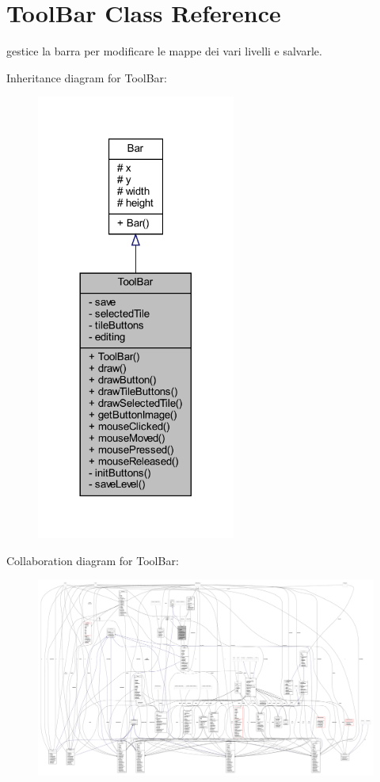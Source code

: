 \hypertarget{classui_1_1_tool_bar}{}\section{Tool\+Bar Class Reference}
\label{classui_1_1_tool_bar}


gestice la barra per modificare le mappe dei vari livelli e salvarle.  




Inheritance diagram for Tool\+Bar\+:\nopagebreak
\begin{figure}[H]
\begin{center}
\leavevmode
\includegraphics[width=185pt]{classui_1_1_tool_bar__inherit__graph}
\end{center}
\end{figure}


Collaboration diagram for Tool\+Bar\+:
\nopagebreak
\begin{figure}[H]
\begin{center}
\leavevmode
\includegraphics[width=350pt]{classui_1_1_tool_bar__coll__graph}
\end{center}
\end{figure}
